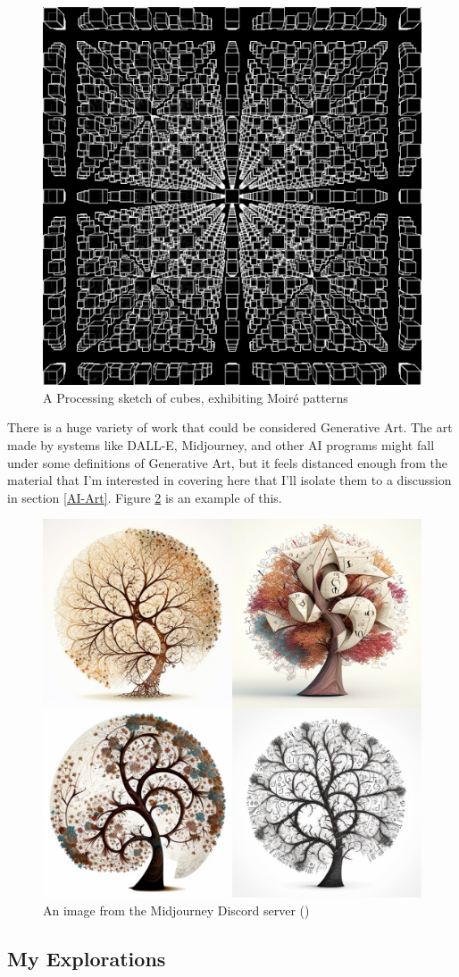 \documentclass[12pt,twoside]{reedthesis}
\begin{document}
	\begin{figure}[h]
	\centering
	\includegraphics[width=0.7\linewidth]{Images/Grid}
	\caption{A Processing sketch of cubes, exhibiting Moiré patterns}
	\label{Grid}
	\end{figure}
	
	There is a huge variety of work that could be considered Generative Art. The art made by systems like DALL-E, Midjourney, and other AI programs might fall under some definitions of Generative Art, but it feels distanced enough from the material that I'm interested in covering here that I'll isolate them to a discussion in section \ref{AI-Art}. Figure \ref{Midjourney} is an example of this.
	
	\begin{figure}[h]
	\centering
	\includegraphics[width=0.4\linewidth]{Images/MidjourneyMathTree}
	\caption{An image from the Midjourney Discord server (\cite{midjourney2023})}
	\label{Midjourney}
	\end{figure}
	
\subsection{My Explorations} %
	
\end{document}
